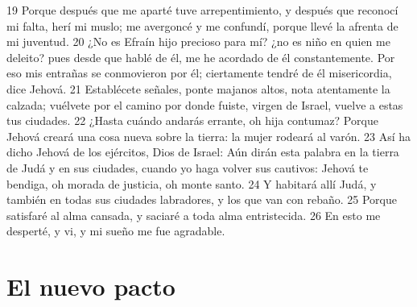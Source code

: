 19 Porque después que me aparté tuve arrepentimiento, y después que reconocí mi falta, herí mi muslo; me avergoncé y me confundí, porque llevé la afrenta de mi juventud.
20 ¿No es Efraín hijo precioso para mí? ¿no es niño en quien me deleito? pues desde que hablé de él, me he acordado de él constantemente. Por eso mis entrañas se conmovieron por él; ciertamente tendré de él misericordia, dice Jehová.
21 Establécete señales, ponte majanos altos, nota atentamente la calzada; vuélvete por el camino por donde fuiste, virgen de Israel, vuelve a estas tus ciudades.
22 ¿Hasta cuándo andarás errante, oh hija contumaz? Porque Jehová creará una cosa nueva sobre la tierra: la mujer rodeará al varón.
23 Así ha dicho Jehová de los ejércitos, Dios de Israel: Aún dirán esta palabra en la tierra de Judá y en sus ciudades, cuando yo haga volver sus cautivos: Jehová te bendiga, oh morada de justicia, oh monte santo.
24 Y habitará allí Judá, y también en todas sus ciudades labradores, y los que van con rebaño.
25 Porque satisfaré al alma cansada, y saciaré a toda alma entristecida.
26 En esto me desperté, y vi, y mi sueño me fue agradable.

\section*{El nuevo pacto}

